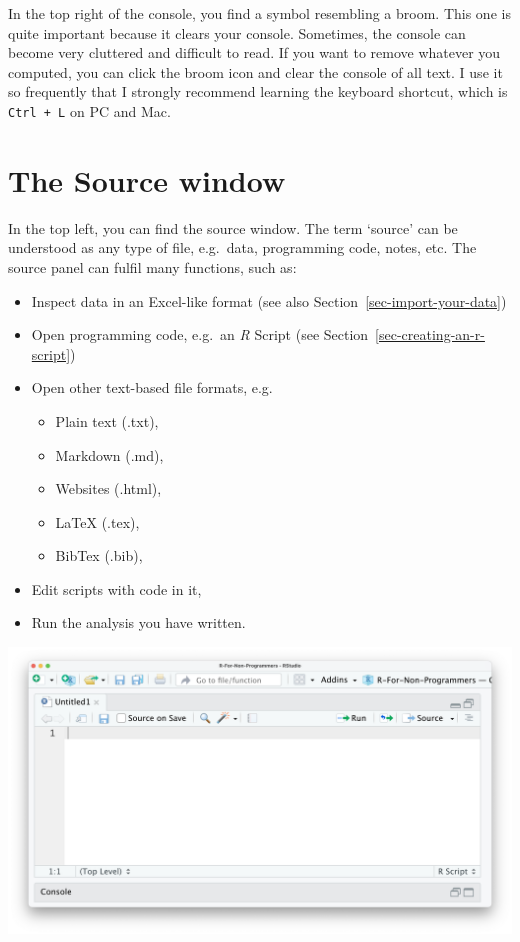 \documentclass[
  letterpaper,
]{krantz}
\begin{document}
In the top right of the console, you find a symbol resembling a broom.
This one is quite important because it clears your console. Sometimes,
the console can become very cluttered and difficult to read. If you want
to remove whatever you computed, you can click the broom icon and clear
the console of all text. I use it so frequently that I strongly
recommend learning the keyboard shortcut, which is \texttt{Ctrl\ +\ L}
on PC and Mac.

\section{The Source window}\label{sec-the-source-window}

In the top left, you can find the source window. The term `source' can
be understood as any type of file, e.g.~data, programming code, notes,
etc. The source panel can fulfil many functions, such as:

\begin{itemize}
\item
  Inspect data in an Excel-like format (see also
  Section~\ref{sec-import-your-data})
\item
  Open programming code, e.g.~an \emph{R} Script (see
  Section~\ref{sec-creating-an-r-script})
\item
  Open other text-based file formats, e.g.

  \begin{itemize}
  \item
    Plain text (.txt),
  \item
    Markdown (.md),
  \item
    Websites (.html),
  \item
    LaTeX (.tex),
  \item
    BibTex (.bib),
  \end{itemize}
\item
  Edit scripts with code in it,
\item
  Run the analysis you have written.
\end{itemize}

\includegraphics{images/chapter_04_img/03_source_window/01_rstudio_source.png}
\end{document}

